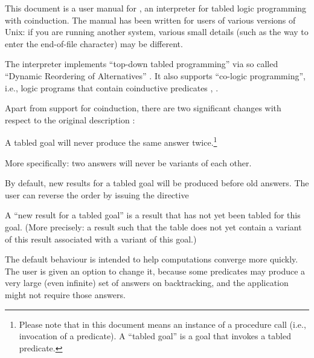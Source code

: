 

This document is a user manual for , an interpreter for tabled
logic programming with coinduction.  The manual has been written for users of
various versions of Unix: if you are running another system, various small
details (such as the way to enter the end-of-file character) may be
different.

The interpreter implements ``top-down tabled programming'' via so called
``Dynamic Reordering of Alternatives'' \cite{guo-gupta-dra}.  It also
supports ``co-logic programming'', i.e., logic programs that contain
coinductive predicates \cite{coinductive}, \cite{co-LP}.


Apart from support for coinduction, there are two significant changes with
respect to the original description \cite{guo-gupta-dra}:
\begin{Enumerate}

\item
  A tabled goal will never produce the same answer twice.\footnote{
  Please note that in this document  means an instance of a
  procedure call (i.e., invocation of a predicate).  A ``tabled
  goal'' is a goal that
  invokes a tabled predicate.}

  More specifically: two answers will never be variants of each
  other.

\item
  By default, new results for a tabled goal will be produced before old
  answers.  The user can reverse the order by issuing the directive\\
  \ind{}\label{dir:old-first}

  A ``new result for a tabled goal''\label{new-result} is a result that has
  not yet been tabled for this goal.  (More precisely: a result such that the
  table does not yet contain a variant of this result associated with a
  variant of this goal.)

  The default behaviour is intended to help computations converge more
  quickly.  The user is given an option to change it, because some predicates
  may produce a very large (even infinite) set of answers on backtracking,
  and the application might not require those answers.
\end{Enumerate}


%
%

